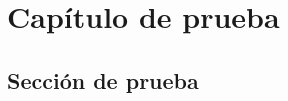 \documentclass{book}
\begin{document}
\pagestyle{myestilo}
\chapter{Capítulo de prueba}
\section{Sección de prueba}
\lipsum[1-5]
\end{document}

